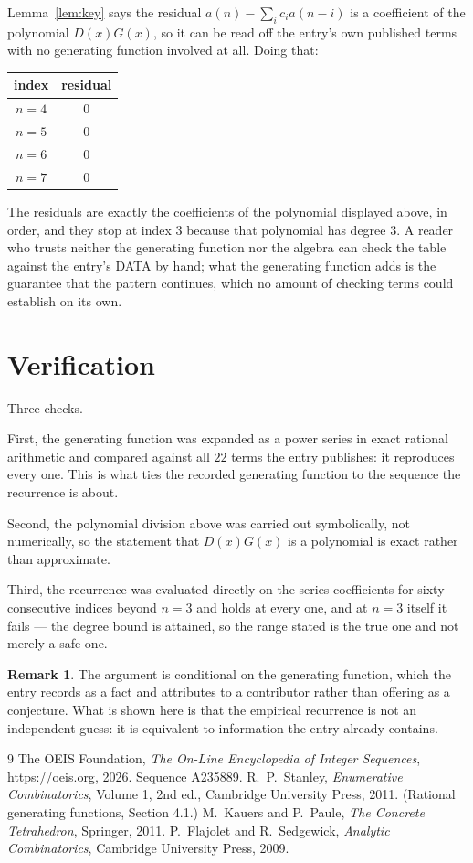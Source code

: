 \documentclass[11pt,a4paper]{article}
\theoremstyle{plain}
\theoremstyle{definition}
\newtheorem{remark}[theorem]{Remark}
\begin{document}
Lemma~\ref{lem:key} says the residual $a(n)-\sum_ic_ia(n-i)$ is a coefficient of the
polynomial $D(x)G(x)$, so it can be read off the entry's own published terms with no
generating function involved at all. Doing that:
\begin{center}
\begin{tabular}{cc}
index & residual \\ \hline
$n=4$ & $0$ \\
$n=5$ & $0$ \\
$n=6$ & $0$ \\
$n=7$ & $0$
\end{tabular}
\end{center}
The residuals are exactly the coefficients of the polynomial displayed above, in order, and
they stop at index $3$ because that polynomial has degree $3$. A reader who trusts
neither the generating function nor the algebra can check the table against the entry's DATA
by hand; what the generating function adds is the guarantee that the pattern continues, which
no amount of checking terms could establish on its own.

\section{Verification}

Three checks.

First, the generating function was expanded as a power series in exact rational arithmetic and
compared against all $22$ terms the entry publishes: it reproduces every one. This is
what ties the recorded generating function to the sequence the recurrence is about.

Second, the polynomial division above was carried out symbolically, not numerically, so the
statement that $D(x)G(x)$ is a polynomial is exact rather than approximate.

Third, the recurrence was evaluated directly on the series coefficients for sixty consecutive
indices beyond $n=3$ and holds at every one, and at $n=3$ itself it fails --- the
degree bound is attained, so the range stated is the true one and not merely a safe one.

\begin{remark}
The argument is conditional on the generating function, which the entry records as a fact and
attributes to a contributor rather than offering as a conjecture. What is shown here is that
the empirical recurrence is not an independent guess: it is equivalent to information the
entry already contains.
\end{remark}

\begin{thebibliography}{9}
 The OEIS Foundation, \emph{The On-Line Encyclopedia of Integer
Sequences}, \url{https://oeis.org}, 2026. Sequence A235889.
 R.~P.~Stanley, \emph{Enumerative Combinatorics}, Volume 1, 2nd ed.,
Cambridge University Press, 2011. (Rational generating functions, Section 4.1.)
 M.~Kauers and P.~Paule, \emph{The Concrete Tetrahedron}, Springer, 2011.
 P.~Flajolet and R.~Sedgewick, \emph{Analytic Combinatorics}, Cambridge
University Press, 2009.
\end{thebibliography}
\end{document}
